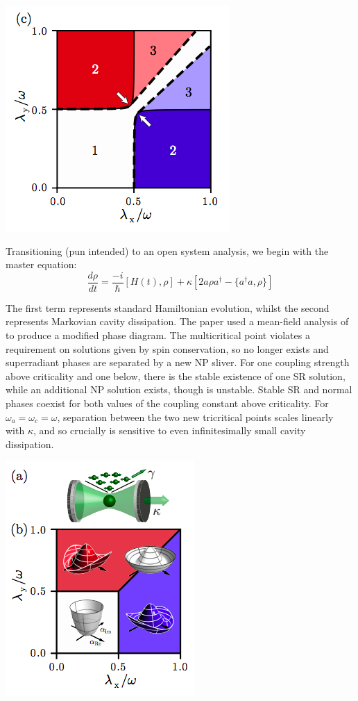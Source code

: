  \includegraphics[scale=0.6]{closedsystem}

Transitioning (pun intended) to an open system analysis, we begin with the master equation:
 \begin{equation}
 \frac{d\rho}{d t} = \frac{-i}{\hbar}[H(t),\rho]+\kappa[2a\rho a^{\dagger}-\{a^{\dagger}a,\rho\}]
 \end{equation}

The first term represents standard Hamiltonian evolution, whilst the second represents Markovian cavity dissipation. The paper used a mean-field analysis of to produce a modified phase diagram. The multicritical point violates a requirement on solutions given by spin conservation, so no longer exists and superradiant phases are separated by a new NP sliver. For one coupling strength above criticality and one below, there is the stable existence of one SR solution, while an additional NP solution exists, though is unstable. Stable SR and normal phases coexist for both values of the coupling constant above criticality. For $\omega_{a}=\omega_{c}=\omega$, separation between the two new tricritical points scales linearly with $\kappa$, and so crucially is sensitive to even infinitesimally small cavity dissipation.

\includegraphics[scale=0.6]{opensystem}

